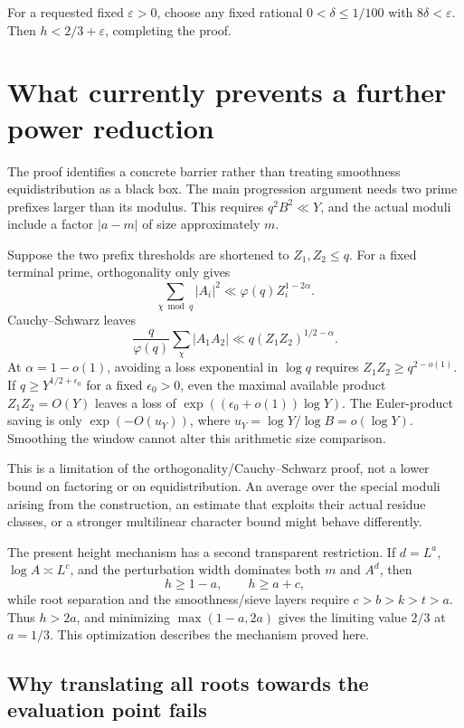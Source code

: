 For a requested fixed \(\varepsilon>0\), choose any fixed rational
\(0<\delta\le1/100\) with \(8\delta<\varepsilon\).
Then \(h<2/3+\varepsilon\), completing the proof.

\section{What currently prevents a further power reduction}
\label{sec:barrier}

The proof identifies a concrete barrier rather than treating
smoothness equidistribution as a black box.  The main progression
argument needs two prime prefixes larger than its modulus.  This
requires \(q^2B^2\ll Y\), and the actual moduli include a factor
\(|a-m|\) of size approximately \(m\).

Suppose the two prefix thresholds are shortened to
\(Z_1,Z_2\le q\).  For a fixed terminal prime, orthogonality only
gives
\[
 \sum_{\chi\bmod q}|A_i|^2
       \ll\varphi(q)Z_i^{1-2\alpha}.
\]
Cauchy--Schwarz leaves
\begin{equation}\label{eq:short-prefix-loss}
 \frac q{\varphi(q)}\sum_\chi|A_1A_2|
       \ll q(Z_1Z_2)^{1/2-\alpha}.
\end{equation}
At \(\alpha=1-o(1)\), avoiding a loss exponential in \(\log q\)
requires \(Z_1Z_2\ge q^{2-o(1)}\).  If
\(q\ge Y^{1/2+\epsilon_0}\) for a fixed \(\epsilon_0>0\), even
the maximal available product \(Z_1Z_2=O(Y)\) leaves a loss of
\(\exp((\epsilon_0+o(1))\log Y)\).  The Euler-product saving is
only \(\exp(-O(u_Y))\), where
\(u_Y=\log Y/\log B=o(\log Y)\).  Smoothing the window cannot
alter this arithmetic size comparison.

This is a limitation of the orthogonality/Cauchy--Schwarz proof,
not a lower bound on factoring or on equidistribution.  An average
over the special moduli arising from the construction, an estimate
that exploits their actual residue classes, or a stronger
multilinear character bound might behave differently.

The present height mechanism has a second transparent restriction.
If \(d=L^a\), \(\log A\asymp L^c\), and the perturbation width
dominates both \(m\) and \(A^d\), then
\[
 h\ge1-a,\qquad h\ge a+c,
\]
while root separation and the smoothness/sieve layers require
\(c>b>k>t>a\).  Thus \(h>2a\), and minimizing
\(\max(1-a,2a)\) gives the limiting value \(2/3\) at
\(a=1/3\).  This optimization describes the mechanism proved here.

\subsection{Why translating all roots towards the evaluation point fails}

